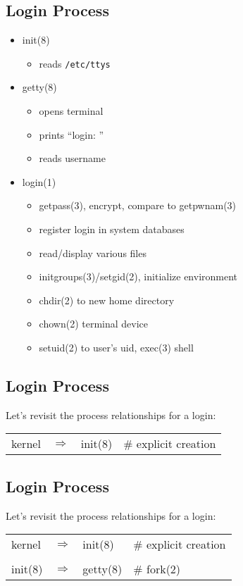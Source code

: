 \documentclass[xga]{xdvislides}
\begin{document}
\subsection{Login Process}
\begin{itemize}
	\item init(8)
		\begin{itemize}
			\item reads {\tt /etc/ttys}
		\end{itemize}
	\item getty(8)
		\begin{itemize}
			\item opens terminal
			\item prints ``login: ''
			\item reads username
		\end{itemize}
	\item login(1)
		\begin{itemize}
			\item getpass(3), encrypt, compare to getpwnam(3)
			\item register login in system databases
			\item read/display various files
			\item initgroups(3)/setgid(2), initialize environment
			\item chdir(2) to new home directory
			\item chown(2) terminal device
			\item setuid(2) to user's uid, exec(3) shell
		\end{itemize}
\end{itemize}



\subsection{Login Process}
Let's revisit the process relationships for a login:
\vspace*{\fill}
\begin{center}
\begin{tabular}[width=.75\texwidth]{l c l l}
kernel & $\Rightarrow$ & init(8) & \# explicit creation\\
\end{tabular}
\end{center}
\vspace*{\fill}

\subsection{Login Process}
Let's revisit the process relationships for a login:
\vspace*{\fill}
\begin{center}
\begin{tabular}[width=.75\texwidth]{l c l l}
kernel & $\Rightarrow$ & init(8) & \# explicit creation\\
\\
init(8) & $\Rightarrow$ & getty(8) & \# fork(2) \\
\end{tabular}
\end{center}
\vspace*{\fill}
\end{document}
